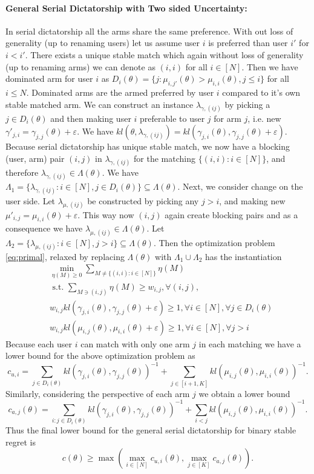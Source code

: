 \documentclass{article}
\begin{document}
\paragraph{General Serial Dictatorship with Two sided Uncertainty:}
In serial dictatorship all the arms share the same preference. With out loss of generality (up to renaming users) let us assume  user $i$ is preferred than user $i'$ for $i < i'$. There exists a unique stable match which again without loss of generality (up to renaming arms) we can denote as $(i,i)$ for all $i \in [N]$. Then we have dominated arm for user $i$ as $D_i(\theta) = \{j: \mu_{i,j'}(\theta) > \mu_{i,i}(\theta), j \leq i\}$ for all $i \leq N$. Dominated arms are the armed preferred by user $i$ compared to it's own stable matched arm. We can construct an instance $\lambda_{\gamma,(ij)}$ by picking a $j \in D_i(\theta)$ and then making user $i$ preferable to  user $j$ for arm $j$, i.e. new $\gamma'_{j,i} = \gamma_{j,j}(\theta) + \varepsilon$. We have $kl(\theta, \lambda_{\gamma,(ij)}) = kl(\gamma_{j,i}(\theta), \gamma_{j,j}(\theta) + \varepsilon)$. Because serial dictatorship has unique stable match, we now have a blocking (user, arm) pair $(i,j)$ in $\lambda_{\gamma,(ij)}$ for the matching $\{(i,i): i \in [N]\}$, and therefore $\lambda_{\gamma,(ij)} \in \Lambda(\theta)$. We have $\Lambda_1 = \{\lambda_{\gamma,(ij)}: i \in [N], j\in D_i(\theta)\} \subseteq \Lambda(\theta)$. Next, we consider change on the user side. Let $\lambda_{\mu,(ij)}$ be constructed by picking any $j > i$, and making new $\mu'_{i,j} = \mu_{i,i}(\theta) + \varepsilon$. This way now $(i,j)$ again create blocking pairs and as a consequence we have $\lambda_{\mu,(ij)} \in \Lambda(\theta)$. Let  $\Lambda_2 = \{\lambda_{\mu,(ij)}: i \in [N], j > i\} \subseteq \Lambda(\theta)$. 
Then the optimization problem \eqref{eq:primal}, relaxed by replacing $\Lambda(\theta)$ with $\Lambda_1\cup \Lambda_2$ has the instantiation 
\begin{align*}
&\min_{\eta(M) \geq 0} \sum_{M\neq \{(i,i): i\in [N]\}} \eta(M)\\
&\text{ s.t. }\sum_{M\ni(i,j)}\eta(M) \geq w_{i,j}, \forall (i,j),\\
&w_{i,j} kl(\gamma_{j,i}(\theta), \gamma_{j,j}(\theta) + \varepsilon) \geq 1, \forall i \in [N], \forall j \in D_i(\theta)\\
&w_{i,j} kl(\mu_{i,j}(\theta), \mu_{i,i}(\theta) + \varepsilon) \geq 1, \forall i \in [N], \forall j > i
\end{align*}
Because each user $i$ can match with only one arm $j$ in each matching we have a lower bound for the above optimization problem as 
$$
c_{u,i} = \sum_{j\in D_i(\theta)}kl(\gamma_{j,i}(\theta), \gamma_{j,j}(\theta))^{-1} + \sum_{j\in [i+1, K]} kl(\mu_{i,j}(\theta), \mu_{i,i}(\theta))^{-1}.
$$
Similarly, considering the perspective of each arm $j$ we obtain a lower bound 
$$c_{a,j}(\theta) =\sum_{i: j \in D_i(\theta)}kl(\gamma_{j,i}(\theta), \gamma_{j,j}(\theta))^{-1} + \sum_{i< j} kl(\mu_{i,j}(\theta), \mu_{i,i}(\theta))^{-1}.
$$
Thus the final lower bound for the general serial dictatorship for binary stable regret is 
$$
c(\theta) \geq \max\left(\max_{i \in [N]}c_{u,i}(\theta), \max_{j \in [K]}c_{a,j}(\theta)\right).
$$
\end{document}
